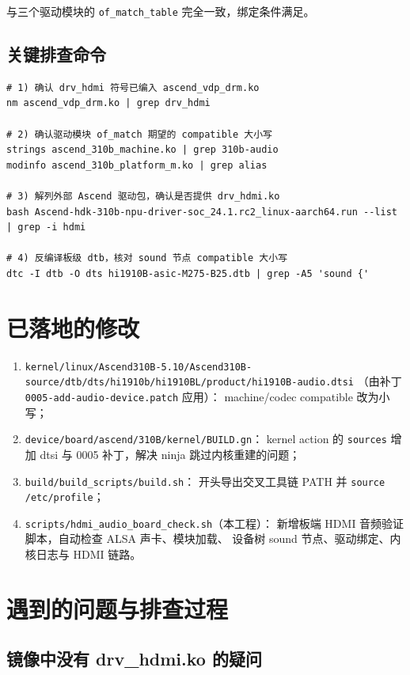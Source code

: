 与三个驱动模块的 \texttt{of\_match\_table} 完全一致，绑定条件满足。

\subsection{关键排查命令}

\begin{lstlisting}[style=shell]
# 1) 确认 drv_hdmi 符号已编入 ascend_vdp_drm.ko
nm ascend_vdp_drm.ko | grep drv_hdmi

# 2) 确认驱动模块 of_match 期望的 compatible 大小写
strings ascend_310b_machine.ko | grep 310b-audio
modinfo ascend_310b_platform_m.ko | grep alias

# 3) 解列外部 Ascend 驱动包，确认是否提供 drv_hdmi.ko
bash Ascend-hdk-310b-npu-driver-soc_24.1.rc2_linux-aarch64.run --list | grep -i hdmi

# 4) 反编译板级 dtb，核对 sound 节点 compatible 大小写
dtc -I dtb -O dts hi1910B-asic-M275-B25.dtb | grep -A5 'sound {'
\end{lstlisting}

\section{已落地的修改}

\begin{enumerate}
  \item \texttt{kernel/linux/Ascend310B-5.10/Ascend310B-source/dtb/dts/hi1910b/hi1910BL/product/hi1910B-audio.dtsi}
  （由补丁 \texttt{0005-add-audio-device.patch} 应用）：
  machine/codec compatible 改为小写；
  \item \texttt{device/board/ascend/310B/kernel/BUILD.gn}：
  kernel action 的 \texttt{sources} 增加 dtsi 与 0005 补丁，解决
  ninja 跳过内核重建的问题；
  \item \texttt{build/build\_scripts/build.sh}：
  开头导出交叉工具链 PATH 并 \texttt{source /etc/profile}；
  \item \texttt{scripts/hdmi\_audio\_board\_check.sh}（本工程）：
  新增板端 HDMI 音频验证脚本，自动检查 ALSA 声卡、模块加载、
  设备树 sound 节点、驱动绑定、内核日志与 HDMI 链路。
\end{enumerate}

\section{遇到的问题与排查过程}

\subsection{镜像中没有 drv\_hdmi.ko 的疑问}

